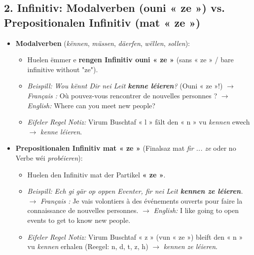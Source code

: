 \subsection*{2. Infinitiv: Modalverben (ouni « ze ») vs. Prepositionalen Infinitiv (mat « ze »)}
\begin{itemize}
    \item \textbf{Modalverben} (\textit{kënnen}, \textit{müssen}, \textit{däerfen}, \textit{wëllen}, \textit{sollen}):
    \begin{itemize}
        \item Huelen ëmmer e \textbf{rengen Infinitiv ouni « ze »} (sans « ze » / bare infinitive without "ze").
        \item \textit{Beispill:} \textit{Wou kënnt Dir nei Leit \textbf{kenne léieren}?} (Ouni « ze »!)
        $\rightarrow$ \textit{Français :} Où pouvez-vous rencontrer de nouvelles personnes ?
        $\rightarrow$ \textit{English:} Where can you meet new people?
        \item \textit{Eifeler Regel Notiz:} Virum Buschtaf « l » fält den « n » vu \textit{kennen} ewech $\rightarrow$ \textit{kenne léieren}.
    \end{itemize}

    \vspace{0.4em}

    \item \textbf{Prepositionalen Infinitiv mat « ze »} (Finalsaz mat \textit{fir ... ze} oder no Verbe wéi \textit{probéieren}):
    \begin{itemize}
        \item Huelen den Infinitiv mat der Partikel \textbf{« ze »}.
        \item \textit{Beispill:} \textit{Ech gi gär op oppen Eventer, fir nei Leit \textbf{kennen ze léieren}.}
        $\rightarrow$ \textit{Français :} Je vais volontiers à des événements ouverts pour faire la connaissance de nouvelles personnes.
        $\rightarrow$ \textit{English:} I like going to open events to get to know new people.
        \item \textit{Eifeler Regel Notiz:} Virum Buschtaf « z » (vun « ze ») bleift den « n » vu \textit{kennen} erhalen (Reegel: n, d, t, z, h) $\rightarrow$ \textit{kennen ze léieren}.
    \end{itemize}
\end{itemize}

\vspace{0.8em}

